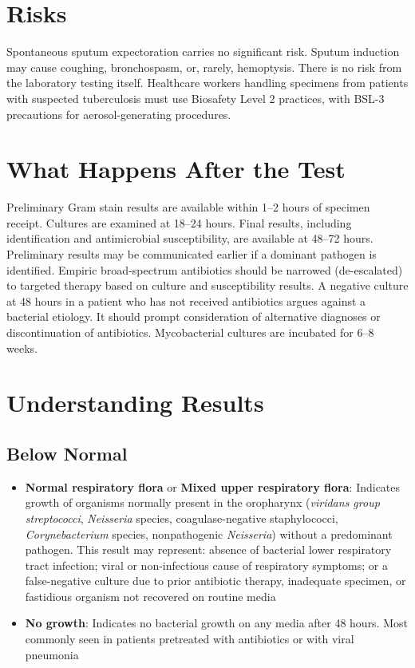 \section*{Risks}
Spontaneous sputum expectoration carries no significant risk. Sputum induction may cause coughing, bronchospasm, or, rarely, hemoptysis. There is no risk from the laboratory testing itself. Healthcare workers handling specimens from patients with suspected tuberculosis must use Biosafety Level 2 practices, with BSL-3 precautions for aerosol-generating procedures.

\section*{What Happens After the Test}
Preliminary Gram stain results are available within 1--2 hours of specimen receipt. Cultures are examined at 18--24 hours. Final results, including identification and antimicrobial susceptibility, are available at 48--72 hours. Preliminary results may be communicated earlier if a dominant pathogen is identified. Empiric broad-spectrum antibiotics should be narrowed (de-escalated) to targeted therapy based on culture and susceptibility results. A negative culture at 48 hours in a patient who has not received antibiotics argues against a bacterial etiology. It should prompt consideration of alternative diagnoses or discontinuation of antibiotics. Mycobacterial cultures are incubated for 6--8 weeks.

\section*{Understanding Results}

\subsection*{Below Normal}
\begin{itemize}
  \item \textbf{Normal respiratory flora} or \textbf{Mixed upper respiratory flora}: Indicates growth of organisms normally present in the oropharynx (\textit{viridans group streptococci}, \textit{Neisseria} species, coagulase-negative staphylococci, \textit{Corynebacterium} species, nonpathogenic \textit{Neisseria}) without a predominant pathogen. This result may represent: absence of bacterial lower respiratory tract infection; viral or non-infectious cause of respiratory symptoms; or a false-negative culture due to prior antibiotic therapy, inadequate specimen, or fastidious organism not recovered on routine media
  \item \textbf{No growth}: Indicates no bacterial growth on any media after 48 hours. Most commonly seen in patients pretreated with antibiotics or with viral pneumonia
\end{itemize}

